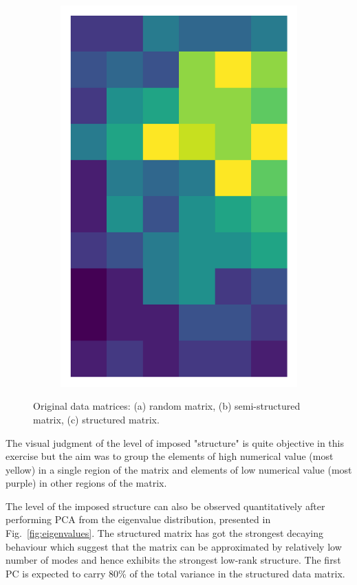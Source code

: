 \documentclass[10pt,twocolumn]{article}
\begin{document}
\begin{figure}[H]
\begin{subfigure}[t]{.15\textwidth}
\includegraphics[scale=.2]{structured-matrix-original.png}
\caption{ }
\end{subfigure}
\caption{Original data matrices: (a) random matrix, (b) semi-structured matrix, (c) structured matrix.}
\label{fig:matrices}
\end{figure}

The visual judgment of the level of imposed "structure" is quite objective in this exercise but the aim was to group the elements of high numerical value (most yellow) in a single region of the matrix and elements of low numerical value (most purple) in other regions of the matrix.

The level of the imposed structure can also be observed quantitatively after performing PCA from the eigenvalue distribution, presented in Fig.~\ref{fig:eigenvalues}. The structured matrix has got the strongest decaying behaviour which suggest that the matrix can be approximated by relatively low number of modes and hence exhibits the strongest low-rank structure. The first PC is expected to carry 80\% of the total variance in the structured data matrix.
\end{document}
